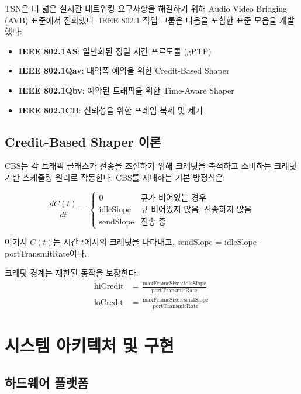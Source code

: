\documentclass[twocolumn,10pt]{article}
\begin{document}
TSN은 더 넓은 실시간 네트워킹 요구사항을 해결하기 위해 Audio Video Bridging (AVB) 표준에서 진화했다. IEEE 802.1 작업 그룹은 다음을 포함한 표준 모음을 개발했다:

\begin{itemize}
    \item \textbf{IEEE 802.1AS}: 일반화된 정밀 시간 프로토콜 (gPTP)
    \item \textbf{IEEE 802.1Qav}: 대역폭 예약을 위한 Credit-Based Shaper
    \item \textbf{IEEE 802.1Qbv}: 예약된 트래픽을 위한 Time-Aware Shaper
    \item \textbf{IEEE 802.1CB}: 신뢰성을 위한 프레임 복제 및 제거
\end{itemize}

\subsection{Credit-Based Shaper 이론}

CBS는 각 트래픽 클래스가 전송을 조절하기 위해 크레딧을 축적하고 소비하는 크레딧 기반 스케줄링 원리로 작동한다. CBS를 지배하는 기본 방정식은:

\begin{equation}
\frac{dC(t)}{dt} = \begin{cases}
0 & \text{큐가 비어있는 경우} \\
\text{idleSlope} & \text{큐 비어있지 않음, 전송하지 않음} \\
\text{sendSlope} & \text{전송 중}
\end{cases}
\end{equation}

여기서 $C(t)$는 시간 $t$에서의 크레딧을 나타내고, sendSlope = idleSlope - portTransmitRate이다.

크레딧 경계는 제한된 동작을 보장한다:
\begin{align}
\text{hiCredit} &= \frac{\text{maxFrameSize} \times \text{idleSlope}}{\text{portTransmitRate}} \\
\text{loCredit} &= \frac{\text{maxFrameSize} \times \text{sendSlope}}{\text{portTransmitRate}}
\end{align}

\section{시스템 아키텍처 및 구현}

\subsection{하드웨어 플랫폼}
\end{document}
